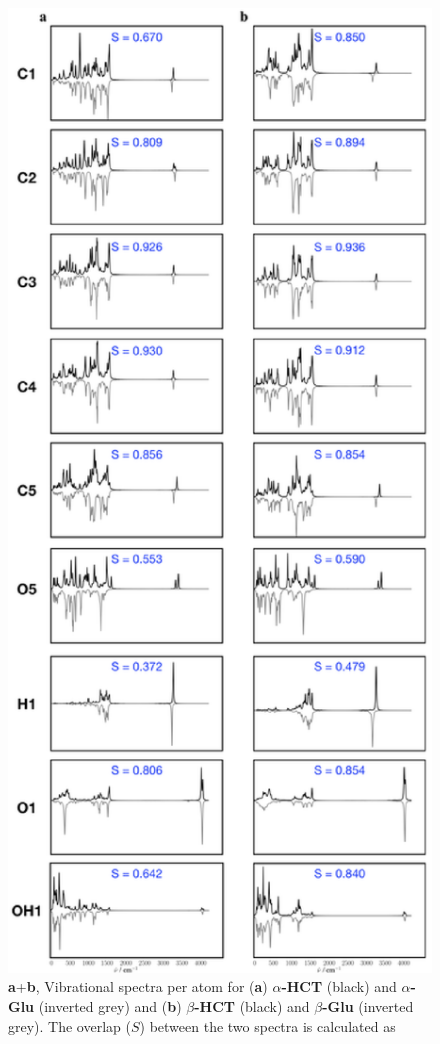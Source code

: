 \documentclass[12pt, english, letter]{article}
\newcommand{\aglu}{\textbf{$\alpha$-Glu}}
\newcommand{\bglu}{\textbf{$\beta$-Glu}}
\newcommand{\ahct}{\textbf{$\alpha$-HCT}}
\newcommand{\bhct}{\textbf{$\beta$-HCT}}
\begin{document}
	\begin{figure}[h!]
		\centering
		\includegraphics[height=0.7\textheight]{sfig1.eps}
		\caption{%
			\textbf{a}+\textbf{b}, Vibrational spectra per atom for (\textbf{a}) \ahct{} (black) and \aglu{} (inverted grey) and (\textbf{b}) \bhct{} (black) and \bglu{} (inverted grey). The overlap ($S$) between the two spectra is calculated as 
}
\end{figure}
\end{document}

